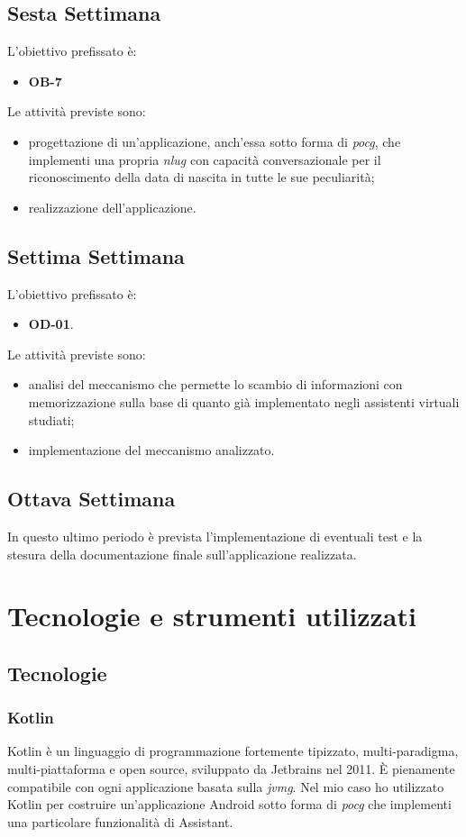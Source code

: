 	\subsection*{Sesta Settimana}
	L'obiettivo prefissato è:
	\begin{itemize}
		\item \textbf{OB-7}
	\end{itemize}
	Le attività previste sono:
	\begin{itemize}
		\item progettazione di un'applicazione, anch'essa sotto forma di \emph{\gls{pocg}}, che implementi una propria \emph{\gls{nlug}} con capacità conversazionale per il riconoscimento della data di nascita in tutte le sue peculiarità;
		\item realizzazione dell'applicazione.
	\end{itemize}
	\subsection*{Settima Settimana}
	L'obiettivo prefissato è:
	\begin{itemize}
		\item \textbf{OD-01}.
	\end{itemize}
	Le attività previste sono:
	\begin{itemize}
		\item analisi del meccanismo che permette lo scambio di informazioni con memorizzazione sulla base di quanto già implementato negli assistenti virtuali studiati;
		\item implementazione del meccanismo analizzato.
	\end{itemize}
	\subsection*{Ottava Settimana}
	In questo ultimo periodo è prevista l'implementazione di eventuali test e la stesura della documentazione finale sull'applicazione realizzata.

\section{Tecnologie e strumenti utilizzati}
	\subsection{Tecnologie}
		\subsubsection{Kotlin}
		Kotlin è un linguaggio di programmazione fortemente tipizzato, multi-paradigma, multi-piattaforma e open source, sviluppato da Jetbrains nel 2011. È pienamente compatibile con ogni applicazione basata sulla \emph{\gls{jvmg}}\glsfirstoccur. Nel mio caso ho utilizzato Kotlin per costruire un'applicazione Android sotto forma di \emph{\gls{pocg}} che implementi una particolare funzionalità di Assistant.
